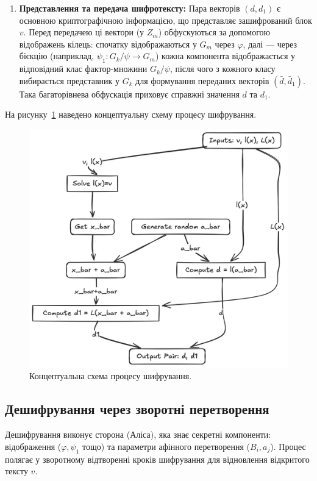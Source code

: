 \begin{enumerate}
    \item \textbf{Представлення та передача шифротексту:} Пара векторів $(d, d_1)$ є основною криптографічною інформацією, що представляє зашифрований блок $v$.
    Перед передачею ці вектори (у $Z_m$) обфускуються за допомогою відображень кілець: спочатку відображаються у $G_m$ через $\varphi$, далі — через бієкцію (наприклад, $\psi_1: G_k/\psi \to G_m$) кожна компонента відображається у відповідний клас фактор-множини $G_k/\psi$, після чого з кожного класу вибирається представник у $G_k$ для формування переданих векторів $(\bar{d}, \bar{d}_1)$.
    Така багаторівнева обфускація приховує справжні значення $d$ та $d_1$.
\end{enumerate}

На рисунку~\ref{fig:encryption_logic} наведено концептуальну схему процесу шифрування.
\begin{figure}[ht]
    \centering
    \includegraphics[width=0.5\textheight,keepaspectratio]{pictures/Encryption Core Logic Conceptual Diagram}
    \caption{Концептуальна схема процесу шифрування.}
    \label{fig:encryption_logic}
\end{figure}

\subsection{Дешифрування через зворотні перетворення}
\label{subsec:decryption_mechanism}
Дешифрування виконує сторона (Аліса), яка знає секретні компоненти: відображення ($\varphi, \psi_1$ тощо) та параметри афінного перетворення ($B_i, a_j$).
Процес полягає у зворотному відтворенні кроків шифрування для відновлення відкритого тексту $v$.

